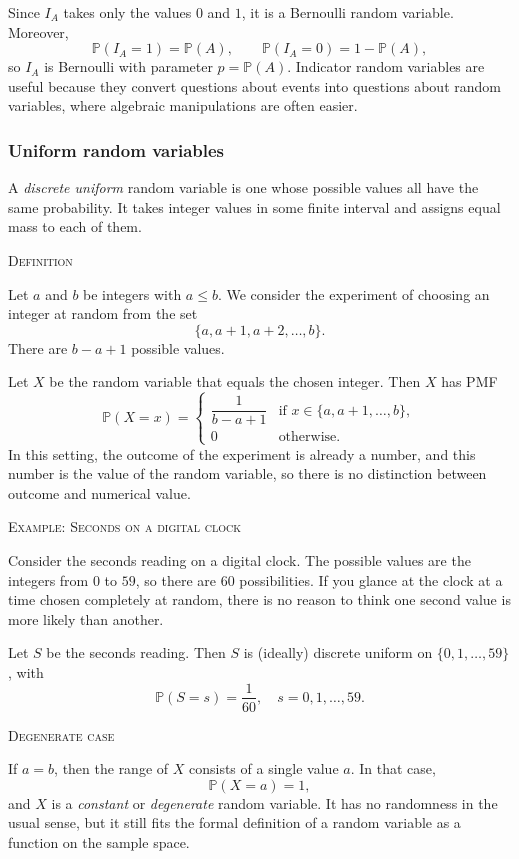 Since \(I_A\) takes only the values \(0\) and \(1\), it is a Bernoulli random variable.  
Moreover,
\[
\mathbb{P}(I_A = 1) = \mathbb{P}(A), \qquad \mathbb{P}(I_A = 0) = 1 - \mathbb{P}(A),
\]
so \(I_A\) is Bernoulli with parameter \(p = \mathbb{P}(A)\).  
Indicator random variables are useful because they convert questions about events into questions about random variables, where algebraic manipulations are often easier.


\subsubsection{Uniform random variables}

A \textit{discrete uniform} random variable is one whose possible values all have the same probability.  
It takes integer values in some finite interval and assigns equal mass to each of them.

\bigskip\textsc{Definition}

Let \(a\) and \(b\) be integers with \(a \le b\).  
We consider the experiment of choosing an integer at random from the set
\[
\{a, a+1, a+2, \dots, b\}.
\]
There are \(b - a + 1\) possible values.  

Let \(X\) be the random variable that equals the chosen integer.  
Then \(X\) has PMF
\[
\mathbb{P}(X = x) =
\begin{cases}
\dfrac{1}{b - a + 1} & \text{if } x \in \{a, a+1, \dots, b\},\\[4pt]
0 & \text{otherwise.}
\end{cases}
\]
In this setting, the outcome of the experiment is already a number, and this number is the value of the random variable, so there is no distinction between outcome and numerical value.

\bigskip\textsc{Example: Seconds on a digital clock}

Consider the seconds reading on a digital clock.  
The possible values are the integers from \(0\) to \(59\), so there are \(60\) possibilities.  
If you glance at the clock at a time chosen completely at random, there is no reason to think one second value is more likely than another.  

Let \(S\) be the seconds reading.  
Then \(S\) is (ideally) discrete uniform on \(\{0,1,\dots,59\}\), with
\[
\mathbb{P}(S = s) = \frac{1}{60}, \quad s = 0,1,\dots,59.
\]

\bigskip\textsc{Degenerate case}

If \(a = b\), then the range of \(X\) consists of a single value \(a\).  
In that case,
\[
\mathbb{P}(X = a) = 1,
\]
and \(X\) is a \textit{constant} or \textit{degenerate} random variable.  
It has no randomness in the usual sense, but it still fits the formal definition of a random variable as a function on the sample space.


